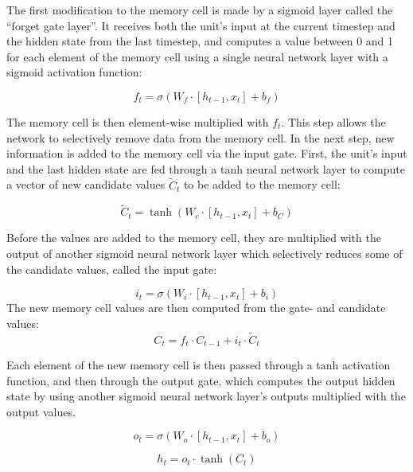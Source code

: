 \documentclass[11pt,a4paper,twoside,openright]{scrbook}
\begin{document}
The first modification to the memory cell is made by a sigmoid layer called the “forget gate layer”. It receives both the unit’s input at the current timestep and the hidden state from the last timestep, and computes a value between 0 and 1 for each element of the memory cell using a single neural network layer with a sigmoid activation function:

\begin{equation}
f_t = \sigma (W_f \cdot [h_{t-1},x_t] + b_f)
\end{equation}
	
The memory cell is then element-wise multiplied with $f_t$. This step allows the network to selectively remove data from the memory cell. In the next step, new information is added to the memory cell via the input gate. First, the unit’s input and the last hidden state are fed through a tanh neural network layer to compute a vector of new candidate values $\widetilde C_t$ to be added to the memory cell:

\begin{equation}
\widetilde C_t = \tanh(W_c \cdot [h_{t-1}, x_t] + b_C)
\end{equation}
	
Before the values are added to the memory cell, they are multiplied with the output of another sigmoid neural network layer which selectively reduces some of the candidate values, called the input gate:

\begin{equation}
i_t = \sigma (W_i \cdot [h_{t-1},x_t] + b_i)
\end{equation}
The new memory cell values are then computed from the gate- and candidate values:
\begin{equation}
C_t = f_t \cdot C_{t-1} + i_t \cdot \widetilde C_t
\end{equation}
	
Each element of the new memory cell is then passed through a tanh activation function, and then through the output gate, which computes the output hidden state by using another sigmoid neural network layer’s outputs multiplied with the output values.

\begin{equation}
o_t = \sigma (W_o \cdot [h_{t-1},x_t] + b_o)
\end{equation}

\begin{equation}
h_t = o_t \cdot \tanh(C_t)
\end{equation}
\end{document}

